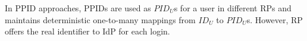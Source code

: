 






In PPID approaches, PPIDs are used as $PID_U$s for a user in different RPs and maintains deterministic one-to-many mappings from $ID_U$ to $PID_U$s.
However, RP offers the real identifier to IdP for each login. 

